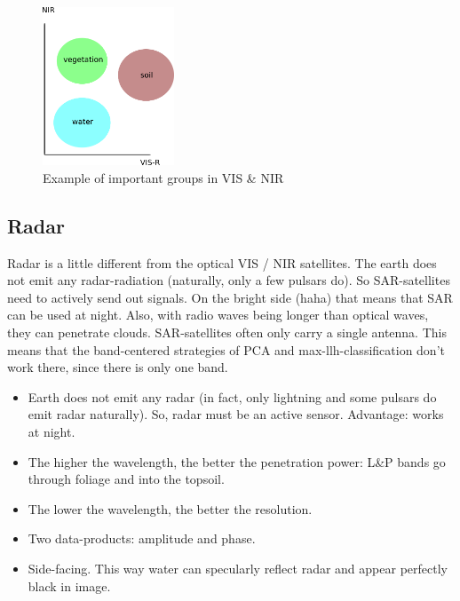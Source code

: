 \begin{figure}[H]
    \caption{Example of important groups in VIS \& NIR}
    \centering
      \includegraphics[width=0.35\textwidth]{images/rs_vis_nir_groups.png}
\end{figure}


\subsection{Radar}
Radar is a little different from the optical VIS / NIR satellites.
The earth does not emit any radar-radiation (naturally, only a few pulsars do). So SAR-satellites need to actively send out signals.
On the bright side (haha) that means that SAR can be used at night. Also, with radio waves being longer than optical waves, they can penetrate clouds.
SAR-satellites often only carry a single antenna. This means that the band-centered strategies of PCA and max-llh-classification don't work there, since there is only one band.


\begin{itemize}
    \item Earth does not emit any radar (in fact, only lightning and some pulsars do emit radar naturally). So, radar must be an active sensor. Advantage: works at night.
    \item The higher the wavelength, the better the penetration power: L\&P bands go through foliage and into the topsoil.
    \item The lower the wavelength, the better the resolution.
    \item Two data-products: amplitude and phase.
    \item Side-facing. This way water can specularly reflect radar and appear perfectly black in image.
\end{itemize}




